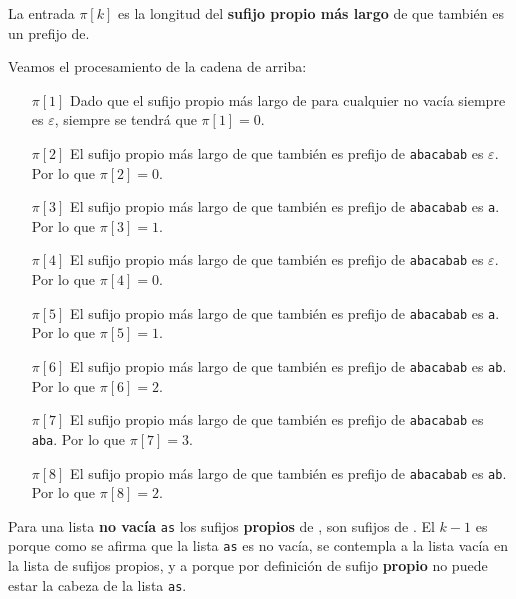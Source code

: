 \begin{center}
La entrada $\pi[k]$ es la longitud del \textbf{sufijo propio más largo} de
 que también es un prefijo de.
\end{center}

Veamos el procesamiento de la cadena de arriba:
\begin{itemize}
\item[$\pi{[1]}$] Dado que el sufijo propio más largo de  para
cualquier no vacía siempre es $\varepsilon$, siempre se tendrá que $\pi[1] = 0$.
\item[$\pi{[2]}$] El sufijo propio más largo de  que también es
prefijo de \texttt{abacabab} es $\varepsilon$. Por lo que $\pi[2] = 0$.
\item[$\pi{[3]}$] El sufijo propio más largo de  que también es
prefijo de \texttt{abacabab} es \texttt{a}. Por lo que $\pi[3] = 1$.
\item[$\pi{[4]}$] El sufijo propio más largo de  que también es
prefijo de \texttt{abacabab} es $\varepsilon$. Por lo que $\pi[4] = 0$.
\item[$\pi{[5]}$] El sufijo propio más largo de  que también
es prefijo de \texttt{abacabab} es \texttt{a}. Por lo que $\pi[5] = 1$.
\item[$\pi{[6]}$] El sufijo propio más largo de  que también
es prefijo de \texttt{abacabab} es \texttt{ab}. Por lo que $\pi[6] = 2$.
\item[$\pi{[7]}$] El sufijo propio más largo de  que también
es prefijo de \texttt{abacabab} es \texttt{aba}. Por lo que $\pi[7] = 3$.
\item[$\pi{[8]}$] El sufijo propio más largo de  que también
es prefijo de \texttt{abacabab} es \texttt{ab}. Por lo que $\pi[8] = 2$.
\end{itemize}

Para una lista \textbf{no vacía} \texttt{as} los sufijos \textbf{propios} de ,
son sufijos de . El $k-1$ es porque como se afirma que la lista
\texttt{as} es no vacía, se contempla a la lista vacía en la lista de sufijos propios, y a
 porque por definición de sufijo \textbf{propio} no puede estar la cabeza de
la lista \texttt{as}.


